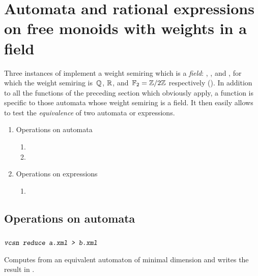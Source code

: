 

\section{Automata and rational expressions \protect\\
\eee\ee on free monoids with weights in a field}
\label{sec:aut-fre-fld}%

Three instances of \tafkitv implement a weight semiring which is a 
\emph{field}:
%
, , and , 
for which the weight semiring is~$\mathbb{Q}$, $\mathbb{R}$, 
and~$\mathbb{F}_{2}=\mathbb{Z}/2\mathbb{Z}$ respectively (\cf {}).
In addition to all the functions of the preceding section which 
obviously apply, a function  is specific to those automata 
whose weight semiring is a field. 
It then easily allows to test the \emph{equivalence} of 
two automata or expressions.

\renewcommand{\theenumii}{\theenumi.\arabic{enumii}}

\begin{enumerate}

\item Operations on automata

\begin{enumerate}
\item {}
\item {}
\end{enumerate}

\item Operations on expressions

\begin{enumerate}
\item {}
\end{enumerate}

\end{enumerate}


\subsection{Operations on automata}
\label{ssc:ope-aut-fld}%

\subsubsection{}

\begin{SwClCmd}
\begin{shell}
$ \textsl{\texttt{vcsn reduce a.xml > b.xml}}
$
\end{shell}%
\end{SwClCmd}%
\begin{SwClTxt}
    Computes from  an equivalent 
    automaton of minimal dimension and writes the result in . 
\end{SwClTxt}%

